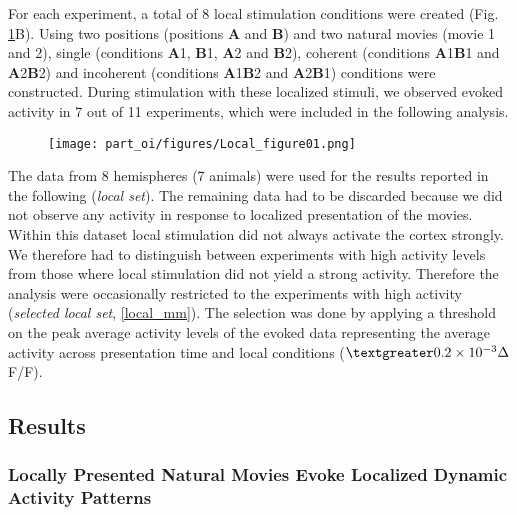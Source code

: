 For each experiment, a total of 8 local stimulation conditions were created
(Fig. \ref{loc_cond}B). Using two positions (positions \textbf{A} and
\textbf{B}) and two natural movies (movie 1 and 2), single (conditions
\textbf{A}1, \textbf{B}1, \textbf{A}2 and \textbf{B}2), coherent
(conditions \textbf{A}1\textbf{B}1 and \textbf{A}2\textbf{B}2) and
incoherent (conditions \textbf{A}1\textbf{B}2 and \textbf{A}2\textbf{B}1)
conditions were constructed. During stimulation with these localized
stimuli, we observed evoked activity in 7 out of 11 experiments, which were
included in the following analysis. 

\begin{figure}[!htb]
\centerline{\texttt{[image: part\_oi/figures/Local\_figure01.png]}}
\caption[Presentation of Natural Movies.]{\protect} 
\label{loc_cond}
\end{figure} 
	


The data from 8 hemispheres (7 animals) were used for the results reported
in the following (\textit{local set}). The remaining data had to be
discarded because we did not observe any activity in response to localized
presentation of the movies. Within this dataset local stimulation did not
always activate the cortex strongly. We therefore had to distinguish
between experiments with high activity levels from those where local
stimulation did not yield a strong activity. Therefore the analysis were
occasionally restricted  to the experiments with high activity
(\textit{selected local set}, \ref{local_mm}). The selection was done by
applying a threshold on the peak average activity levels of the evoked data
representing the average activity across presentation time and local
conditions ($\textgreater 0.2 \times 10^{-3} \Delta$ F/F).

\subsection{Results}


\subsubsection{Locally Presented Natural Movies Evoke Localized Dynamic
Activity Patterns}



